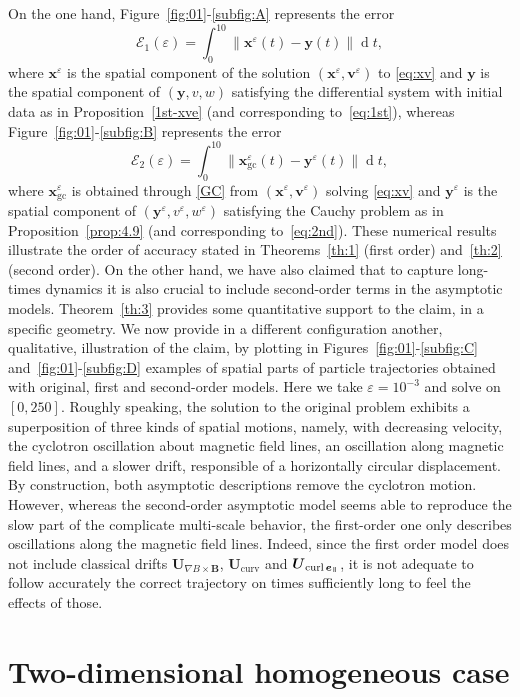 \documentclass[10pt]{amsart}
\let\mathcal\mathscr
\newcounter{subfig}
\let\eps\varepsilon
\DeclareMathOperator\dD{d}\let\dd\dD
\DeclareMathOperator{\Curl}{curl}
\theoremstyle{plain}
\theoremstyle{definition}
\newcommand\bB{{\boldsymbol B}}
\newcommand\bU{{\boldsymbol U}}
\newcommand\bfv{{\boldsymbol v}}
\newcommand\bfx{{\boldsymbol x}}
\newcommand\bfy{{\boldsymbol y}}
\newcommand\cE{{\mathcal E}}
\DeclareMathOperator{\beD}{\boldsymbol{e}}
\newcommand\eDpar{\beD_\mypar}
\let\e w
\newcommand{\GC}{\bfx_\mathrm{gc}}
\newcommand{\gradB}{\bU_{\nabla B\times\bB}}
\newcommand{\curvB}{\bU_{\mathrm{curv}}}
\newcommand{\rotB}{\bU_{\Curl\eDpar}}
\newcommand{\mypar}{{\mkern3mu\vphantom{\perp}\vrule depth 0pt\mkern2mu\vrule depth 0pt\mkern3mu}}
\begin{document}
On the one hand, Figure~\ref{fig:01}-\eqref{subfig:A} represents the error
\[
\cE_1(\eps) = \int_0^{10} \| \bfx^\eps(t) - \bfy(t) \| \dD t,
\]
where $\bfx^\eps$ is the spatial component of the solution $(\bfx^\eps,\bfv^\eps)$ to \eqref{eq:xv} and $\bfy$ is the spatial component of $(\bfy,v,\e)$ satisfying the differential system with initial data as in Proposition~\ref{1st-xve} (and corresponding to~\eqref{eq:1st}), whereas Figure~\ref{fig:01}-\eqref{subfig:B} represents the error
\[
\cE_2(\eps) = \int_0^{10}\| \GC^\eps(t) - \bfy^\eps(t) \| \dD t,
\]
where $\GC^\eps$ is obtained through \eqref{GC} from $(\bfx^\eps,\bfv^\eps)$
solving \eqref{eq:xv} and $\bfy^\eps$ is the spatial component of $(\bfy^\eps,v^\eps,\e^\eps)$ satisfying the Cauchy problem as in Proposition~\ref{prop:4.9} (and corresponding to~\eqref{eq:2nd}). These numerical results illustrate the order of accuracy stated in Theorems~\ref{th:1} (first order) and~\ref{th:2} (second order). On the other hand, we have also claimed that to capture long-times dynamics it is also crucial to include second-order terms in the asymptotic models. Theorem~\ref{th:3} provides some quantitative support to the claim, in a specific geometry. We now provide in a different configuration another, qualitative, illustration of the claim, by plotting in Figures~\ref{fig:01}-\eqref{subfig:C} and~\ref{fig:01}-\eqref{subfig:D} examples of spatial parts of particle trajectories obtained with original, first and second-order models. Here we take $\eps=10^{-3}$ and solve on $[0,250]$. Roughly speaking, the solution to the original problem exhibits a superposition of three kinds of spatial motions, namely, with decreasing velocity, the cyclotron oscillation about magnetic field lines, an oscillation along magnetic field lines, and a slower drift, responsible of a horizontally circular displacement. By construction, both asymptotic descriptions remove the cyclotron motion. However, whereas the second-order asymptotic model seems able to reproduce the slow part of the complicate multi-scale behavior, the first-order one only describes oscillations along the magnetic field lines. Indeed, since the first order model does not include classical drifts $\gradB$, $\curvB$ and $\rotB$, it is not adequate to follow accurately the correct trajectory on times sufficiently long to feel the effects of those.

\section{Two-dimensional homogeneous case}\label{s:homogeneous}
\end{document}
